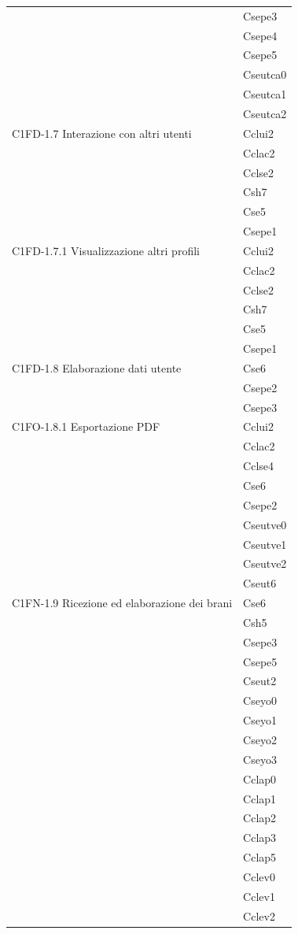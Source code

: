 \begin{footnotesize}
\begin{longtable}[!h]{|l|l|}
& Csepe3\\
& Csepe4\\
& Csepe5\\
& Cseutca0\\
& Cseutca1\\
& Cseutca2\\\hline  
C1FD-1.7 Interazione con altri utenti & Cclui2\\
& Cclac2\\
& Cclse2\\
& Csh7\\
& Cse5\\
& Csepe1\\\hline     
C1FD-1.7.1 Visualizzazione altri profili & Cclui2\\
& Cclac2\\
& Cclse2\\
& Csh7\\
& Cse5\\
& Csepe1\\\hline  
C1FD-1.8 Elaborazione dati utente & Cse6\\
& Csepe2\\
& Csepe3\\\hline   
C1FO-1.8.1 Esportazione PDF & Cclui2\\
& Cclac2\\
& Cclse4\\
& Cse6\\
& Csepe2\\
& Cseutve0\\
& Cseutve1\\
& Cseutve2\\
& Cseut6\\\hline  
C1FN-1.9 Ricezione ed elaborazione dei brani & Cse6\\
& Csh5\\
& Csepe3\\
& Csepe5\\
& Cseut2\\
& Cseyo0\\
& Cseyo1\\
& Cseyo2\\
& Cseyo3\\
& Cclap0\\
& Cclap1\\
& Cclap2\\
& Cclap3\\
& Cclap5\\
& Cclev0\\
& Cclev1\\
& Cclev2\\\hline  

\end{longtable}
\end{footnotesize}
